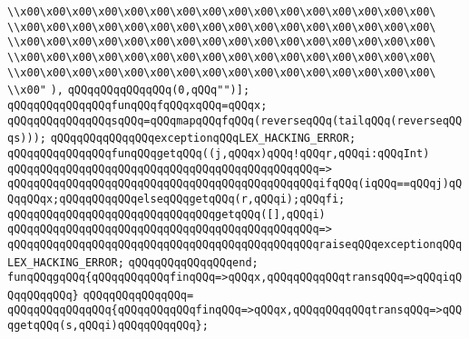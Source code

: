 \verb|\\x00\x00\x00\x00\x00\x00\x00\x00\x00\x00\x00\x00\x00\x00\x00\x00\|\newline
\verb|\\x00\x00\x00\x00\x00\x00\x00\x00\x00\x00\x00\x00\x00\x00\x00\x00\|\newline
\verb|\\x00\x00\x00\x00\x00\x00\x00\x00\x00\x00\x00\x00\x00\x00\x00\x00\|\newline
\verb|\\x00\x00\x00\x00\x00\x00\x00\x00\x00\x00\x00\x00\x00\x00\x00\x00\|\newline
\verb|\\x00\x00\x00\x00\x00\x00\x00\x00\x00\x00\x00\x00\x00\x00\x00\x00\|\newline
\verb|\\x00"|\newline
\verb|),|\newline
\verb|qQQqqQQqqQQqqQQq(0,qQQq"")];|\newline
\verb|qQQqqQQqqQQqqQQqfunqQQqfqQQqxqQQq=qQQqx;|\newline
\verb|qQQqqQQqqQQqqQQqsqQQq=qQQqmapqQQqfqQQq(reverseqQQq(tailqQQq(reverseqQQqs)));|\newline
\verb|qQQqqQQqqQQqqQQqexceptionqQQqLEX_HACKING_ERROR;|\newline
\verb|qQQqqQQqqQQqqQQqfunqQQqgetqQQq((j,qQQqx)qQQq!qQQqr,qQQqi:qQQqInt)|\newline
\verb|qQQqqQQqqQQqqQQqqQQqqQQqqQQqqQQqqQQqqQQqqQQqqQQq=>|\newline
\verb|qQQqqQQqqQQqqQQqqQQqqQQqqQQqqQQqqQQqqQQqqQQqqQQqifqQQq(iqQQq==qQQqj)qQQqqQQqx;qQQqqQQqqQQqelseqQQqgetqQQq(r,qQQqi);qQQqfi;|\newline
\newline
\verb|qQQqqQQqqQQqqQQqqQQqqQQqqQQqqQQqgetqQQq([],qQQqi)|\newline
\verb|qQQqqQQqqQQqqQQqqQQqqQQqqQQqqQQqqQQqqQQqqQQqqQQq=>|\newline
\verb|qQQqqQQqqQQqqQQqqQQqqQQqqQQqqQQqqQQqqQQqqQQqqQQqraiseqQQqexceptionqQQqLEX_HACKING_ERROR;|\newline
\verb|qQQqqQQqqQQqqQQqend;|\newline
\verb|funqQQqgqQQq{qQQqqQQqqQQqfinqQQq=>qQQqx,qQQqqQQqqQQqtransqQQq=>qQQqiqQQqqQQqqQQq}|\newline
\verb|qQQqqQQqqQQqqQQq=|\newline
\verb|qQQqqQQqqQQqqQQq{qQQqqQQqqQQqfinqQQq=>qQQqx,qQQqqQQqqQQqtransqQQq=>qQQqgetqQQq(s,qQQqi)qQQqqQQqqQQq};|\newline
